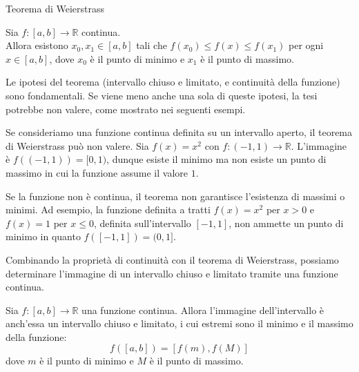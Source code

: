 \documentclass[12pt]{report}
\newcommand{\R}{\mathbb{R}}
\begin{document}
	\begin{teorema}{Teorema di Weierstrass}{}
		
		Sia $f: [a, b] \to \R$ continua.\\
		Allora esistono $x_0, x_1 \in [a, b]$ tali che $f(x_0) \leq f(x) \leq f(x_1)$ per ogni $x \in [a, b]$, dove $x_0$ è il punto di minimo e $x_1$ è il punto di massimo.
		
	\end{teorema}
	
	Le ipotesi del teorema (intervallo chiuso e limitato, e continuità della funzione) sono fondamentali. Se viene meno anche una sola di queste ipotesi, la tesi potrebbe non valere, come mostrato nei seguenti esempi.
	
	\begin{osservazione}{}{}
		
		Se consideriamo una funzione continua definita su un intervallo aperto, il teorema di Weierstrass può non valere. Sia $f(x) = x^2$ con $f: (-1, 1) \to \R$. L'immagine è $f((-1, 1)) = [0, 1)$, dunque esiste il minimo ma non esiste un punto di massimo in cui la funzione assume il valore $1$.
		
	\end{osservazione}
	
	\begin{osservazione}{}{}
		
		Se la funzione non è continua, il teorema non garantisce l'esistenza di massimi o minimi. Ad esempio, la funzione definita a tratti $f(x) = x^2$ per $x > 0$ e $f(x) = 1$ per $x \leq 0$, definita sull'intervallo $[-1, 1]$, non ammette un punto di minimo in quanto $f([-1, 1]) = (0, 1]$.
		
	\end{osservazione}
	
	Combinando la proprietà di continuità con il teorema di Weierstrass, possiamo determinare l'immagine di un intervallo chiuso e limitato tramite una funzione continua.
	
	\begin{proposizione}{}{}
		
		Sia $f: [a, b] \to \R$ una funzione continua. Allora l'immagine dell'intervallo è anch'essa un intervallo chiuso e limitato, i cui estremi sono il minimo e il massimo della funzione:
		\[
		f([a, b]) = [f(m), f(M)]
		\]
		dove $m$ è il punto di minimo e $M$ è il punto di massimo.
		
	\end{proposizione}
	
\end{document}
